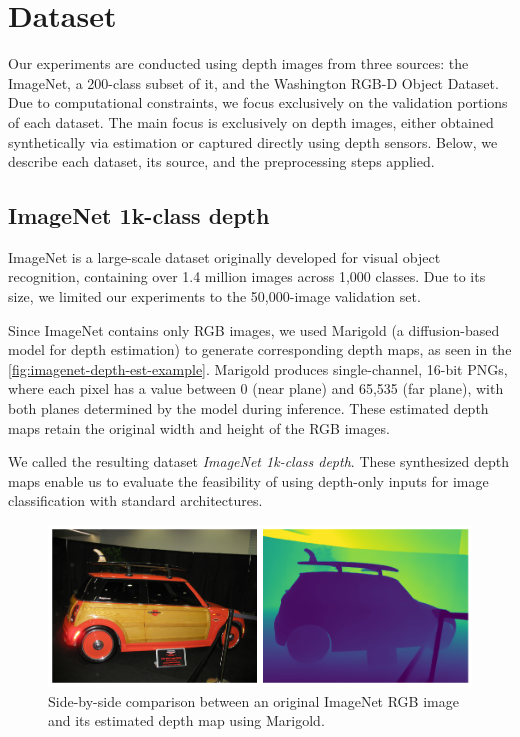 \section{Dataset}

Our experiments are conducted using depth images from three sources: the ImageNet, a 200-class subset of it, and the Washington RGB-D Object Dataset. Due to computational constraints, we focus exclusively on the validation portions of each dataset. The main focus is exclusively on depth images, either obtained synthetically via estimation or captured directly using depth sensors. Below, we describe each dataset, its source, and the preprocessing steps applied.

\subsection{ImageNet 1k-class depth}
ImageNet \cite{imagenet} is a large-scale dataset originally developed for visual object recognition, containing over 1.4 million images across 1,000 classes. Due to its size, we limited our experiments to the 50,000-image validation set. 

Since ImageNet contains only RGB images, we used Marigold \cite{marigold} (a diffusion-based model for depth estimation) to generate corresponding depth maps, as seen in the \autoref{fig:imagenet-depth-est-example}.
Marigold produces single-channel, 16-bit PNGs, where each pixel has a value between 0 (near plane) and 65,535 (far plane), with both planes determined by the model during inference. These estimated depth maps retain the original width and height of the RGB images.

We called the resulting dataset \textit{ImageNet 1k-class depth}. These synthesized depth maps enable us to evaluate the feasibility of using depth-only inputs for image classification with standard architectures.

\begin{figure}[htb!]
    \centering
    \includegraphics[width=1\linewidth]{./images/Original-vs-Marigold.png}
    \caption{Side-by-side comparison between an original ImageNet RGB image and its estimated depth map using Marigold.}
    \label{fig:imagenet-depth-est-example}
\end{figure}

